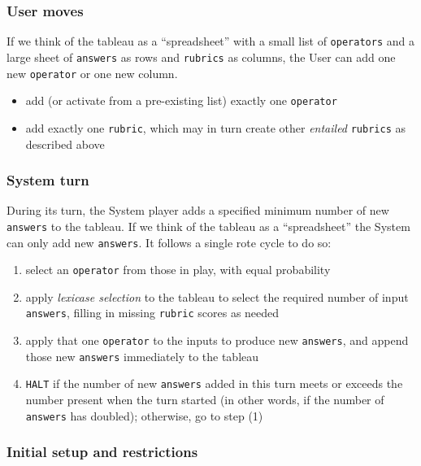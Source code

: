 \subsubsection{User moves}\hypertarget{user-moves}{}\label{user-moves}

If we think of the tableau as a ``spreadsheet'' with a small list of {\tt operators} and a large sheet of {\tt answers} as rows and {\tt rubrics} as columns, the User can add one new {\tt operator} or one new column.

\begin{itemize}
\item add (or activate from a pre-existing list) exactly one {\tt operator}
\item add exactly one {\tt rubric}, which may in turn create other \emph{entailed} {\tt rubrics} as described above
\end{itemize}

\subsubsection{System turn}\hypertarget{system-turn}{}\label{system-turn}

During its turn, the System player adds a specified minimum number of new {\tt answers} to the tableau. If we think of the tableau as a ``spreadsheet'' the System can only add new {\tt answers}. It follows a single rote cycle to do so:

\begin{enumerate}
\item select an {\tt operator} from those in play, with equal probability
\item apply \emph{lexicase selection} to the tableau to select the required number of input {\tt answers}, filling in missing {\tt rubric} scores as needed
\item apply that one {\tt operator} to the inputs to produce new {\tt answers}, and append those new {\tt answers} immediately to the tableau
\item {\tt HALT} if the number of new {\tt answers} added in this turn meets or exceeds the number present when the turn started (in other words, if the number of {\tt answers} has doubled); otherwise, go to step (1)
\end{enumerate}

\subsubsection{Initial setup and restrictions}\hypertarget{initial-setup-and-restrictions}{}\label{initial-setup-and-restrictions}

